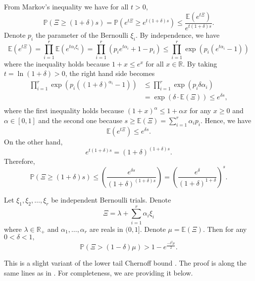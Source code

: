 \documentclass[moor]{informs1}              %
\begin{document}
\begin{APPENDICES}
From Markov's inequality we have for all $t>0$,
 $$ \mathbb{P}( \Xi \geq (1+ \delta ) s ) = \mathbb{P}( e^{t\Xi} \geq e^{t(1+\delta)s} ) \leq \frac{\mathbb{E}(e^{t\Xi})}{e^{t(1+\delta)s}}.$$
 Denote $p_i$ the parameter of the Bernoulli ${\xi}_i$. By independence, we have
 $$  \mathbb{E}(e^{t\Xi})= \prod_{i=1}^r \mathbb{E} (e^{t \alpha_i {\xi}_i}) = \prod_{i=1}^r \left( p_i  e^{t \alpha_i }+1-p_i \right)
 \leq \prod_{i=1}^r \exp \left( p_i  (e^{t \alpha_i }-1) \right)$$
 where the inequality holds because $1+x \leq e^x$ for all $x \in \mathbb{R}$.
 By taking $t=\ln( 1+ \delta) >0$, the right hand side becomes
 \begin{align*}
 \prod_{i=1}^r \exp \left( p_i  ((1+\delta)^{ \alpha_i }-1) \right) &  \leq \prod_{i=1}^r \exp \left( p_i  \delta \alpha_i \right) \\
&  =\exp \left(   \delta  \cdot \mathbb{E}(\Xi ) \right) \leq e^{\delta s} ,\\
 \end{align*}
where the first inequality holds because $ (1+x)^{\alpha} \leq 1+ \alpha x$ for any $x \geq 0$ and $\alpha \in [0,1]$ and the second one because $s \geq \mathbb{E}(\Xi )= \sum_{i=1}^r \alpha_i p_i$. Hence, 
we have  $$  \mathbb{E}(e^{t\Xi}) \leq e^{\delta s}. $$
On the other hand, $$e^{t(1+\delta)s} = (1+\delta) ^{(1+\delta)s}.$$
Therefore,
 $$ \mathbb{P}( \Xi \geq (1+ \delta ) s ) \leq  \left(  \frac{e^{\delta s}}{(1+\delta) ^{(1+\delta)s}} \right) =\left(  \frac{e^{\delta}}{(1+\delta)^{1+\delta} }    \right)^s. $$
\hfill
\Halmos
\endproof

\begin{lemma}  \label{lem:chernof2}
 Let ${\xi}_1,{\xi}_2,\ldots,{\xi}_r$ be independent Bernoulli trials. Denote $$\Xi = \lambda+ \sum_{i=1}^r \alpha_i {\xi}_i$$ where $\lambda \in \mathbb{R}_+$ and $\alpha_1, \ldots, \alpha_r $ are reals in $(0,1]$. Denote $\mu=\mathbb{E}(\Xi )$. Then for any $ 0<\delta < 1,$  
$$ \mathbb{P} ( \Xi > (1- \delta ) \mu ) > 1 - e^{  \frac{-{\delta}^2 \mu}{2}}.$$
\end{lemma}
This is a slight variant of the  lower tail Chernoff bound \cite{chernoff1952measure}. The proof is along the same lines as in \cite{chernoff1952measure}.  For completeness, we are providing it below.


\end{APPENDICES}
\end{document}
